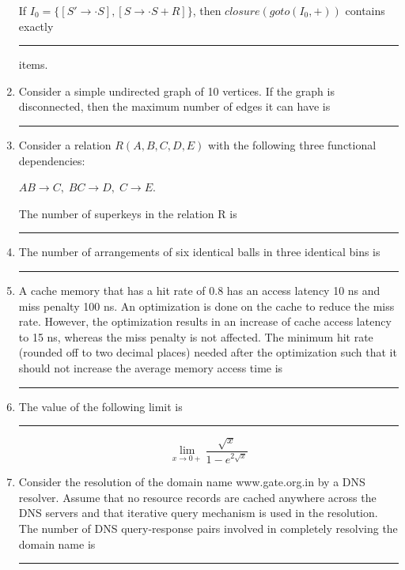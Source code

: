 \begin{enumerate}
If $I_0 = \{ [S' \to \cdot S], [S \to \cdot S+R] \}$, then $closure(goto(I_0,+))$ contains exactly \rule{2cm}{0.4pt} items.  

\hfill{}

\item Consider a simple undirected graph of 10 vertices. If the graph is disconnected, then the maximum number of edges it can have is \rule{2cm}{0.4pt}  

\hfill{}

\item Consider a relation $R(A,B,C,D,E)$ with the following three functional dependencies:  

$AB \to C, \; BC \to D, \; C \to E$.  

The number of superkeys in the relation R is \rule{2cm}{0.4pt}  

\hfill{}

\item The number of arrangements of six identical balls in three identical bins is \rule{2cm}{0.4pt}  

\hfill{}

\item A cache memory that has a hit rate of 0.8 has an access latency 10 ns and miss penalty 100 ns. An optimization is done on the cache to reduce the miss rate. However, the optimization results in an increase of cache access latency to 15 ns, whereas the miss penalty is not affected. The minimum hit rate (rounded off to two decimal places) needed after the optimization such that it should not increase the average memory access time is \rule{2cm}{0.4pt}  

\hfill{}

\item The value of the following limit is \rule{2cm}{0.4pt}  

\[
\lim_{x \to 0+} \frac{\sqrt{x}}{1 - e^{2\sqrt{x}}}
\]

\hfill{}

\item Consider the resolution of the domain name www.gate.org.in by a DNS resolver. Assume that no resource records are cached anywhere across the DNS servers and that iterative query mechanism is used in the resolution. The number of DNS query-response pairs involved in completely resolving the domain name is \rule{2cm}{0.4pt}  


\end{enumerate}
